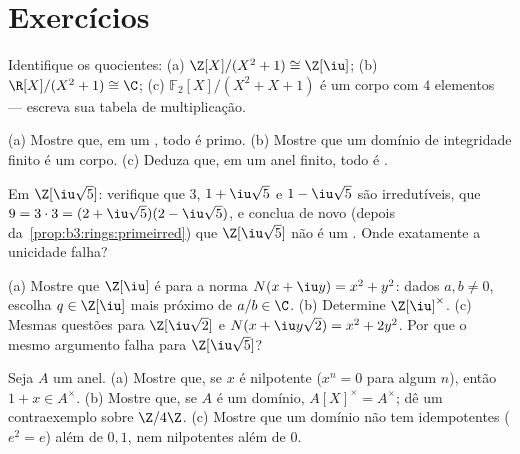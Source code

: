 \section{Exercícios}

\begin{exercise}[$\star$]\label{exo:b3:rings:1}
Identifique os quocientes: (a) $\Z[X]/(X^2 + 1) \cong \Z[\iu]$; (b) $\R[X]/(X^2+1) \cong \C$; (c) $\mathbb F_2[X]/(X^2 + X + 1)$ é um corpo
com $4$ elementos --- escreva sua tabela de multiplicação.
\end{exercise}

\begin{exercise}[$\star$]\label{exo:b3:rings:2}
(a) Mostre que, em um , todo  é primo.
(b) Mostre que um domínio de integridade finito é um corpo.
(c) Deduza que, em um anel finito, todo  é .
\end{exercise}

\begin{exercise}[$\star$]\label{exo:b3:rings:3}
Em $\Z[\iu\sqrt5]$: verifique que $3$, $1 + \iu\sqrt5$ e $1 -
\iu\sqrt5$ são irredutíveis, que
$9 = 3\cdot 3 = (2 +
\iu\sqrt5)(2 - \iu\sqrt5)$, e conclua de novo (depois da~\cref{prop:b3:rings:primeirred}) que $\Z[\iu\sqrt5]$ não é um
. Onde exatamente a unicidade falha?
\end{exercise}

\begin{exercise}[$\star\star$]\label{exo:b3:rings:4}
(a) Mostre que $\Z[\iu]$ é  para a norma $N(x + \iu y) =
x^2 + y^2$: dados $a, b \neq 0$,
escolha $q \in \Z[\iu]$ mais próximo de $a/b \in \C$.
(b) Determine $\Z[\iu]^\times$.
(c) Mesmas questões para $\Z[\iu\sqrt2]$ e $N(x + \iu y\sqrt2) =
x^2 + 2y^2$. Por que o mesmo argumento falha
para $\Z[\iu\sqrt5]$?
\end{exercise}

\begin{exercise}[$\star\star$]\label{exo:b3:rings:5}
Seja $A$ um anel. (a) Mostre que, se $x$ é nilpotente ($x^n = 0$
para algum $n$), então $1 + x \in A^\times$. (b) Mostre que, se $A$ é um
domínio, $A[X]^\times = A^\times$; dê um contraexemplo sobre $\Z/4\Z$. (c) Mostre que
um domínio não tem idempotentes ($e^2 = e$) além de $0, 1$, nem
nilpotentes além de $0$.
\end{exercise}

